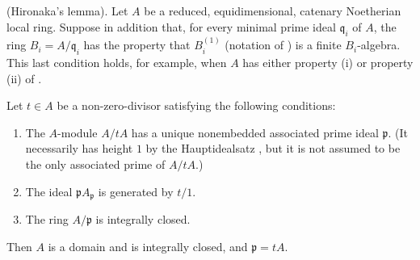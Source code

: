 \begin{proposition}[5.12.8]
\label{IV.5.12.8}
{\normalfont(Hironaka's lemma).}
Let $A$ be a reduced, equidimensional, catenary Noetherian local
ring.  Suppose in addition that, for every minimal prime ideal
$\mathfrak q_i$ of $A$, the ring
$B_i=A/\mathfrak q_i$ has the property that $B_i^{(1)}$
\textup{(notation of )} is a finite $B_i$-algebra.  This
last condition holds, for example, when $A$ has either property
{\rm(i)} or property {\rm(ii)} of .

Let $t\in A$ be a non-zero-divisor satisfying the following
conditions:
\begin{enumerate}[{\rm(i)}]
  \item The $A$-module $A/tA$ has a unique nonembedded associated
  prime ideal $\mathfrak p$.  \textup{(It necessarily has height $1$ by
  the Hauptidealsatz , but it is not assumed to
  be the only associated prime of $A/tA$.)}
  \item The ideal $\mathfrak pA_{\mathfrak p}$ is generated by
  $t/1$.
  \item The ring $A/\mathfrak p$ is integrally closed.
\end{enumerate}
Then $A$ is a domain and is integrally closed, and
$\mathfrak p=tA$.
\end{proposition}


